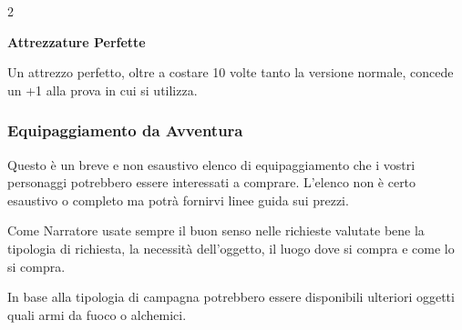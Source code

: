 \begin{multicols}{2}
\medskip

\textbf{Attrezzature Perfette}

Un attrezzo perfetto, oltre a costare 10 volte tanto la versione normale, concede un +1 alla prova in cui si utilizza.

\medskip





\subsubsection{Equipaggiamento da Avventura}

Questo è un breve e non esaustivo elenco di equipaggiamento che i vostri personaggi potrebbero essere interessati a comprare. L'elenco non è certo esaustivo o completo ma potrà fornirvi linee guida sui prezzi.

Come Narratore usate sempre il buon senso nelle richieste valutate bene la tipologia di richiesta, la necessità dell'oggetto, il luogo dove si compra e come lo si compra.

In base alla tipologia di campagna potrebbero essere disponibili ulteriori oggetti quali armi da fuoco o alchemici.

\medskip\label{equipaggiamentolista}


\end{multicols}
